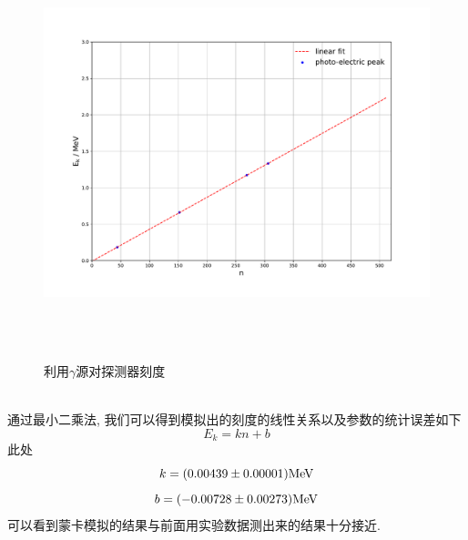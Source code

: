 \documentclass[a4paper]{article}
\begin{document}
\begin{figure}[ht]
 \centering
 \includegraphics[height=12cm, width=16cm]{images/phyex4_fig2.pdf}
 \caption{利用$\gamma$源对探测器刻度}
 \label{fig:fig10}
\end{figure}\\
通过最小二乘法, 我们可以得到模拟出的刻度的线性关系以及参数的统计误差如下
\begin{equation}
    E_k=kn+b
\end{equation}
此处
\begin{equation}
k=(0.00439\pm0.00001)\rm MeV
\end{equation}
\begin{equation}
b=(-0.00728\pm0.00273)\rm MeV
\end{equation}
可以看到蒙卡模拟的结果与前面用实验数据测出来的结果十分接近.
\newpage
\end{document}
